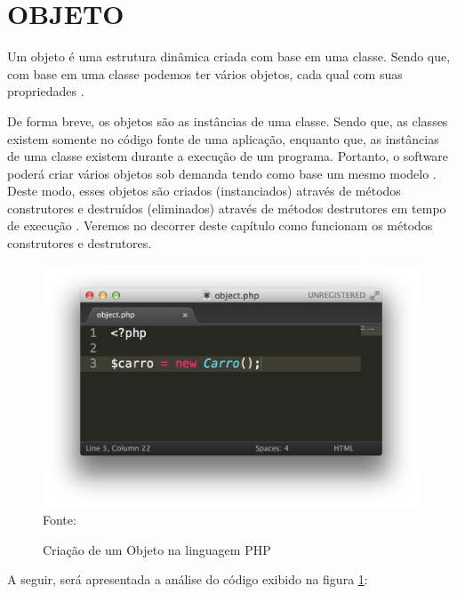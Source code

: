 \section{OBJETO}

Um objeto é uma estrutura dinâmica criada com base em uma classe. Sendo que, 
com base em uma classe podemos ter vários objetos, cada qual com suas 
propriedades \cite{phpProgramandoComOrientacaoAObjetos}. 

De forma breve, os objetos são as instâncias de uma classe. Sendo que, as
classes existem somente no código fonte de uma aplicação, enquanto que, as 
instâncias de uma classe existem durante a execução de um programa. Portanto, 
o software poderá criar vários objetos sob demanda tendo como base um mesmo 
modelo \cite{ios7ProgrammingFundamentalsObjectiveCXcodeAndCocoaBasics}. Deste
modo, esses objetos são criados (instanciados) através de métodos construtores 
e destruídos (eliminados) através de métodos destrutores em tempo de execução
\cite{umlEC++GuiaPraticoDeDesenvolvimentoOrientadoAObjeto}. Veremos no decorrer
deste capítulo como funcionam os métodos construtores e destrutores.

\begin{figure}[h!tb]
	\centering
	\caption{Criação de um Objeto na linguagem PHP}
	\includegraphics[width=\textwidth]{images/object.png}
	\label{fig:objeto}
	\centering
	\footnotesize Fonte: \fonteOAutor
\end{figure}

\FloatBarrier 	%

A seguir, será apresentada a análise do código exibido na
figura \ref{fig:objeto}: 

